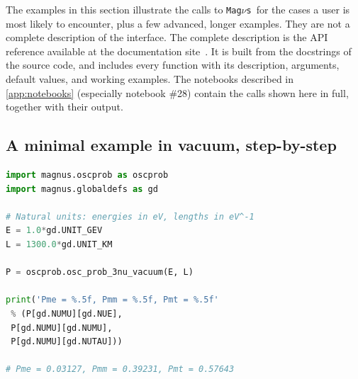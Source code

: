 \documentclass[final,5p,times,twocolumn,sort,compress]{elsarticle}
\makeatletter
\DeclareRobustCommand{\_}{%
  \ifmmode\nfss@text{\textunderscore}\else\textunderscore\allowbreak\fi}
\newcommand{\magnus}{{\tt Mag}\ensuremath{\nu}{\tt s}}
\makeatother
\begin{document}
The examples in this section illustrate the calls to \magnus\ for the cases a user is most likely to encounter, plus a few advanced, longer examples. They are not a complete description of the interface. The complete description is the API reference available at the documentation site\ \cite{MagnusDocs}. It is built from the docstrings of the source code, and includes every function with its description, arguments, default values, and working examples. The notebooks described in \ref{app:notebooks} (especially notebook \#28) contain the calls shown here in full, together with their output.


\subsection{A minimal example in vacuum, step-by-step}
\label{sec:minimal}

\begin{lstlisting}[language=Python, caption={\textbf{A minimal probability calculation.} The simplest complete calculation: the three-flavor vacuum probabilities for a 1-GeV neutrino over 1\,300~km. The oscillation parameters---here and in the rest of Sec.~\ref{sec:examples}---take their defaults, the NuFIT 6.1 best fit with Super-Kamiokande atmospheric data in normal ordering\ \cite{NuFIT61, Esteban:2024eli}. See Sec.~\ref{sec:minimal} for details.}, label={lst:minimal}, float=tbp]
import magnus.oscprob as oscprob
import magnus.globaldefs as gd

# Natural units: energies in eV, lengths in eV^-1
E = 1.0*gd.UNIT_GEV
L = 1300.0*gd.UNIT_KM

P = oscprob.osc_prob_3nu_vacuum(E, L)

print('Pme = %.5f, Pmm = %.5f, Pmt = %.5f'
 % (P[gd.NUMU][gd.NUE],
 P[gd.NUMU][gd.NUMU],
 P[gd.NUMU][gd.NUTAU]))

# Pme = 0.03127, Pmm = 0.39231, Pmt = 0.57643
\end{lstlisting}
\end{document}
